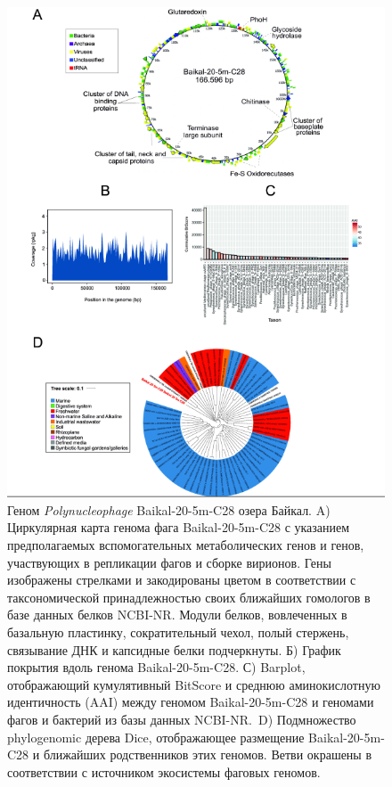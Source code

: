 \documentclass[a4paper,12pt,openany,final]{extreport}
\newcommand\MA[2]{{\sffamily\color{red}\hsmash{$\uparrow$}%
  \smash{\toplap{#1}{\scriptsize\bfseries #2}}}}
\def\oldcaption{} \let\oldcaption=\caption
\def\caption{\stepcounter{captionsnum}\oldcaption}
\renewcommand\MA[2]{}
\begin{document}
\begin{figure}\centering
\includegraphics[width=0.8\linewidth]{media/image11.png}

\caption{Геном \textit{Polynucleophage} Baikal-20-5m-C28 озера Байкал. A) Циркулярная карта генома фага Baikal-20-5m-C28 с указанием предполагаемых вспомогательных метаболических генов и генов, участвующих в репликации фагов и сборке вирионов. Гены изображены стрелками и закодированы цветом в соответствии с таксономической принадлежностью своих ближайших гомологов в базе данных белков NCBI-NR. Модули белков, вовлеченных в базальную пластинку, сократительный чехол, полый стержень, связывание ДНК и капсидные белки подчеркнуты. Б) График покрытия вдоль генома Baikal-20-5m-C28. С) Barplot, отображающий кумулятивный BitScore и среднюю аминокислотную идентичность (AAI) между геномом Baikal-20-5m-C28 и геномами фагов и бактерий из базы данных NCBI-NR.~D) Подмножество phylogenomic дерева Dice, отображающее размещение Baikal-20-5m-C28 и ближайших родственников этих геномов. Ветви окрашены в соответствии с источником экосистемы фаговых геномов.\protect\MA{r}{НЕТ ССЫЛКИ ИЗ ТЕКСТА}}\label{fig:4-6}
\end{figure}
\end{document}
